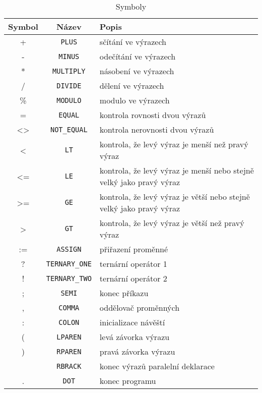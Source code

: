 \documentclass[
12pt,
a4paper,
pdftex,
czech
]{report}
\begin{document}
\begin{longtable}{|c|c|p{10cm}|}
\caption{Symboly}
\label{symboly}
\endfirsthead
\endhead
\hline
		\textbf{Symbol} & \textbf{Název} & \textbf{Popis} \\
\hline
+ & \texttt{PLUS} & sčítání ve výrazech \\ \hline
- & \texttt{MINUS} & odečítání ve výrazech \\ \hline
* & \texttt{MULTIPLY} & násobení ve výrazech \\ \hline
/ & \texttt{DIVIDE} & dělení ve výrazech \\ \hline
\% & \texttt{MODULO} & modulo ve výrazech \\ \hline
= & \texttt{EQUAL} &  kontrola rovnosti dvou výrazů \\ \hline
<> & \texttt{NOT\_EQUAL} & kontrola nerovnosti dvou výrazů \\ \hline
< & \texttt{LT} & kontrola, že levý výraz je menší než pravý výraz \\ \hline
<= & \texttt{LE} & kontrola, že levý výraz je menší nebo stejně velký jako pravý výraz \\ \hline
>= & \texttt{GE} & kontrola, že levý výraz je větší nebo stejně velký jako pravý výraz \\ \hline
> & \texttt{GT} & kontrola, že levý výraz je větší než pravý výraz \\ \hline
:= & \texttt{ASSIGN} & přiřazení proměnné \\ \hline
? & \texttt{TERNARY\_ONE} & ternární operátor 1 \\ \hline
! & \texttt{TERNARY\_TWO} & ternární operátor 2 \\ \hline
; & \texttt{SEMI} & konec příkazu \\ \hline
, & \texttt{COMMA} & oddělovač proměnných \\ \hline
: & \texttt{COLON} & inicializace návěští \\ \hline
( & \texttt{LPAREN} & levá závorka výrazu \\ \hline
) & \texttt{RPAREN} & pravá závorka výrazu \\ \hline
[ & \texttt{LBRACK} & počátek výrazů paralelní deklarace \\ \hline
] & \texttt{RBRACK} & konec výrazů paralelní deklarace \\ \hline
. & \texttt{DOT} & konec programu \\ \hline
\end{longtable}
\end{document}
